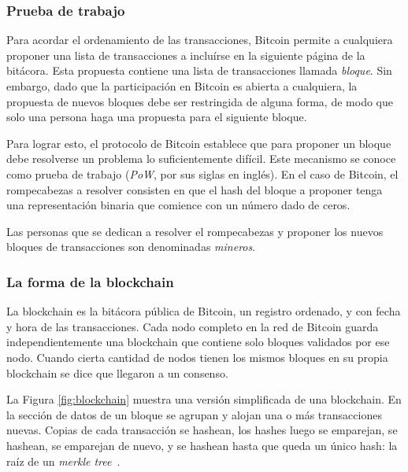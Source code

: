  \subsubsection{Prueba de trabajo}

 Para acordar el ordenamiento de las transacciones, Bitcoin permite a cualquiera proponer una lista
 de transacciones a incluírse en la siguiente página de la bitácora.
 Esta propuesta contiene una lista de transacciones llamada \textit{bloque}.
 Sin embargo, dado que la participación en Bitcoin es abierta a cualquiera, la propuesta de nuevos
 bloques debe ser restringida de alguna forma, de modo que solo una persona haga una propuesta
 para el siguiente bloque.

Para lograr esto, el protocolo de Bitcoin establece que para proponer un bloque debe resolverse
un problema lo suficientemente difícil.
%
Este mecanismo se conoce como prueba de trabajo (\textit{PoW}, por sus siglas en inglés).
%
En el caso de Bitcoin, el rompecabezas a resolver consisten en que el hash del bloque a proponer
tenga una representación binaria que comience con un número dado de ceros.

%
Las personas que se dedican a resolver el rompecabezas y proponer los nuevos bloques de transacciones
son denominadas \textit{mineros}.

\subsubsection{La forma de la blockchain}

La blockchain es la bitácora pública de Bitcoin, un registro ordenado, y con fecha y hora de las transacciones.
%
Cada nodo completo en la red de Bitcoin guarda independientemente una blockchain que contiene solo
bloques validados por ese nodo.
%
Cuando cierta cantidad de nodos tienen los mismos bloques en su propia blockchain
se dice que llegaron a un consenso. 

La Figura \ref{fig:blockchain} muestra una versión simplificada de una blockchain.
En la sección de datos de un bloque
se agrupan y alojan una o más transacciones nuevas. Copias de cada transacción se hashean, los hashes luego
se emparejan, se hashean, se emparejan de nuevo, y se hashean hasta que queda un único hash: la raíz de un
\textit{merkle tree}~\cite{merkle.tree}. 

